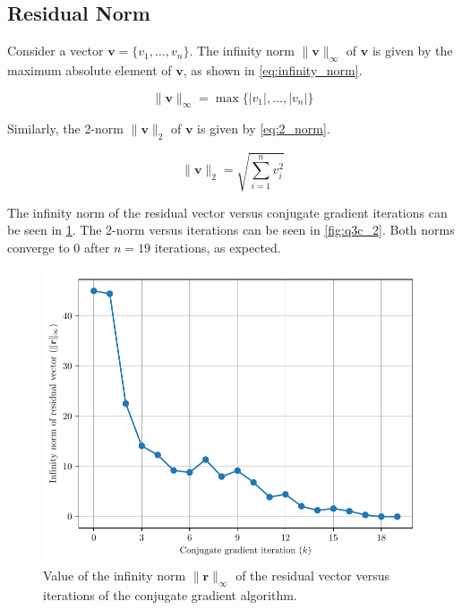 \documentclass[a4paper,titlepage]{article}
\begin{document}
	\subsection{Residual Norm}
	
	Consider a vector $\textbf{v} = \{v_1, \ldots, v_n\}$. The infinity norm $\|\textbf{v}\|_\infty$ of $\textbf{v}$ is given by the maximum absolute element of $\textbf{v}$, as shown in \cref{eq:infinity_norm}.
	
	\begin{equation} \label{eq:infinity_norm}
		\|\textbf{v}\|_\infty = \max\{|v_1|, \ldots, |v_n|\}
	\end{equation}
	
	Similarly, the 2-norm $\|\textbf{v}\|_2$ of $\textbf{v}$ is given by \cref{eq:2_norm}.
	
	\begin{equation} \label{eq:2_norm}
		\|\textbf{v}\|_2 = \sqrt{\sum_{i = 1}^{n} v_i^2}
	\end{equation}
	
	The infinity norm of the residual vector versus conjugate gradient iterations can be seen in \cref{fig:q3c_infinity}. The 2-norm versus iterations can be seen in \cref{fig:q3c_2}. Both norms converge to 0 after $n = 19$ iterations, as expected.
	
	\begin{figure}[!htb]
		\centering
		\includegraphics[width=\columnwidth]{plots/q3c_infinity.pdf}
		\caption
		{Value of the infinity norm $\|\textbf{r}\|_\infty$ of the residual vector versus iterations of the conjugate gradient algorithm.}
		\label{fig:q3c_infinity}
	\end{figure}
	
\end{document}
